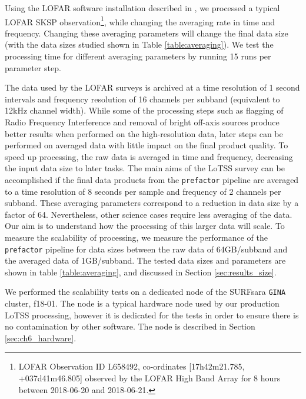 Using the LOFAR software installation described in \cite{mechev17}, we processed a typical LOFAR SKSP observation\footnote{LOFAR Observation ID L658492, co-ordinates [17h42m21.785, +037d41m46.805] observed by the LOFAR High Band Array for 8 hours between 2018-06-20 and 2018-06-21.}, while changing the averaging rate  in time and frequency. Changing these averaging parameters will change the final data size (with the data sizes studied shown in Table \ref{table:averaging}). We test the processing time for different averaging parameters by running 15 runs per parameter step. 

The data used by the LOFAR surveys is archived at a time resolution of 1 second intervals and frequency resolution of 16 channels per subband (equivalent to 12kHz channel width). While some of the processing steps such as flagging of Radio Frequency Interference and removal of bright off-axis sources produce better results when performed on the high-resolution data, later steps can be performed on averaged data with little impact on the final product quality. To speed up processing, the raw data is averaged in time and frequency, decreasing the input data size to later tasks. The main aims of the LoTSS survey can be accomplished if the final data products from the \texttt{prefactor} pipeline are averaged to a time resolution of 8 seconds per sample and frequency of 2 channels per subband. These averaging parameters correspond to a reduction in data size by a factor of 64. Nevertheless, other science cases require less averaging of the data. Our aim is to understand how the processing of this larger data will scale. To measure the scalability of processing, we measure the performance of the \texttt{prefactor} pipeline for data sizes between the raw data of 64GB/subband and the averaged data of 1GB/subband. The tested data sizes and parameters are shown in table \ref{table:averaging}, and discussed in Section \ref{sec:results_size}.

We performed the scalability tests on a dedicated node of the SURFsara \texttt{GINA} cluster, f18-01. The node is a typical hardware node used by our production LoTSS processing, however it is dedicated for the tests in order to ensure there is no contamination by other software. The node is described in Section \ref{sec:ch6_hardware}. 
     

